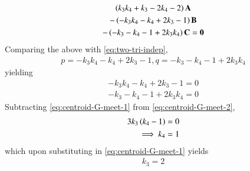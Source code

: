\begin{enumerate}[label=\thesection.\arabic*.,ref=\thesection.\theenumi]
\begin{multline}
	  \left(k_3k_4+k_3-2k_4-2\right)\mathbf{A}
	  \\
	-  \left(-k_3k_4-k_4+2k_3-1\right)\mathbf{B}
	  \\
	  - \left(-k_3-k_4 - 1 
+2k_3k_4\right) \mathbf{C} = \mathbf{0}
  \end{multline}
  Comparing the above with 
	  \eqref{eq:two-tri-indep},
  \begin{align}
	  p = {-k_3k_4-k_4+2k_3-1}, q = {-k_3-k_4 - 1 
+2k_3k_4}
  \end{align}
  yielding 
  \begin{align}
	  \label{eq:centroid-G-meet-1}
	   {-k_3k_4-k_4+2k_3-1} = 0
	   \\ {-k_3-k_4 - 1 
+2k_3k_4} = 0
	  \label{eq:centroid-G-meet-2}
  \end{align}
  Subtracting 
	  \eqref{eq:centroid-G-meet-1}
	  from
	  \eqref{eq:centroid-G-meet-2},
  \begin{align}
	  3k_3\left(k_4-1\right) &= 0
	  \\
	  \implies k_4&=1
  \end{align}
  which upon substituting in 
	  \eqref{eq:centroid-G-meet-1}
	  yields
  \begin{align}
	  k_3 = 2
  \end{align}
  \fi
	  \end{enumerate}
